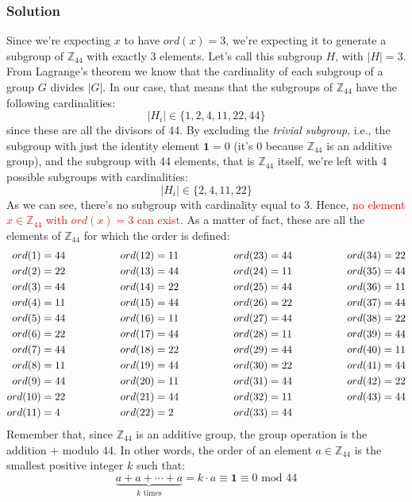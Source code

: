 \documentclass[11pt, a4paper]{article}
\newcommand{\idElement}{
    \textbf{1}
}
\newcommand{\mymod}{
    \text{ mod }
}
\begin{document}
\subsubsection*{Solution}
Since we're expecting $x$ to have $ord(x)=3$, we're expecting it to generate a subgroup of $\mathbb{Z}_{44}$ with exactly 3 elements. Let's call this subgroup $H$, with $|H|=3$. From Lagrange's theorem we know that the cardinality of each subgroup of a group $G$ divides $|G|$. In our case, that means that the subgroups of $\mathbb{Z}_{44}$ have the following cardinalities:
$$|H_i|\in\{1, 2, 4, 11, 22, 44\}$$
since these are all the divisors of 44. By excluding the \textit{trivial subgroup}, i.e., the subgroup with just the identity element $\idElement=0$ (it's 0 because $\mathbb{Z}_{44}$ is an additive group), and the subgroup with 44 elements, that is $\mathbb{Z}_{44}$ itself, we're left with 4 possible subgroups with cardinalities:
$$|H_i|\in\{2,4,11,22\}$$
As we can see, there's no subgroup with cardinality equal to 3. Hence, \textcolor{red}{no element $x\in\mathbb{Z}_{44}$ with $ord(x)=3$ can exist}. As a matter of fact, these are all the elements of $\mathbb{Z}_{44}$ for which the order is defined:
\begin{alignat*}{4}
    ord(1)&=44\hspace{1.5cm}&&ord(12)=11\hspace{1.5cm}&&ord(23)=44\hspace{1.5cm}&&ord(34)=22\\
    ord(2)&=22&&ord(13)=44&&ord(24)=11&&ord(35)=44\\
    ord(3)&=44&&ord(14)=22&&ord(25)=44&&ord(36)=11\\
    ord(4)&=11&&ord(15)=44&&ord(26)=22&&ord(37)=44\\
    ord(5)&=44&&ord(16)=11&&ord(27)=44&&ord(38)=22\\
    ord(6)&=22&&ord(17)=44&&ord(28)=11&&ord(39)=44\\
    ord(7)&=44&&ord(18)=22&&ord(29)=44&&ord(40)=11\\
    ord(8)&=11&&ord(19)=44&&ord(30)=22&&ord(41)=44\\
    ord(9)&=44&&ord(20)=11&&ord(31)=44&&ord(42)=22\\
    ord(10)&=22&&ord(21)=44&&ord(32)=11&&ord(43)=44\\
    ord(11)&=4&&ord(22)=2&&ord(33)=44
\end{alignat*}
Remember that, since $\mathbb{Z}_{44}$ is an additive group, the group operation is the addition $+$ modulo 44. In other words, the order of an element $a\in\mathbb{Z}_{44}$ is the smallest positive integer $k$ such that:
$$\underbrace{a+a+\cdots+a}_{k\text{ times}}=k\cdot a\equiv\idElement\equiv0\mymod44$$
\end{document}
